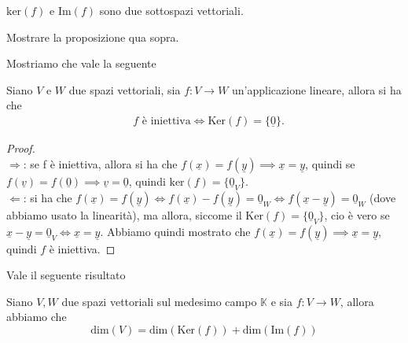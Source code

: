 \begin{prop}
  $\text{ker}(f)$ e $\text{Im}(f)$ sono due sottospazi vettoriali.
\end{prop}
\begin{exercise}
  Mostrare la proposizione qua sopra.
\end{exercise}
Mostriamo che vale la seguente
\begin{prop} \label{prop:kern_iniett}
  Siano $V$ e $W$ due spazi vettoriali, sia $f: V \to W$ un'applicazione lineare, allora si ha che
  \begin{align}
    &f \text{ è iniettiva} \iff \text{Ker}(f) = \{ \underline{0} \}.
  \end{align}
\end{prop}
\begin{proof} \hspace{1cm} \\
  $\boxed{\Rightarrow}$: se f è iniettiva, allora si ha che $f(\underline{x}) = f(\underline{y}) \implies \underline{x} = \underline{y}$, quindi se $f(\underline{v}) = f(\underline{0}) \implies \underline{v} = \underline{0}$, quindi $\text{ker}(f) = \{ \underline{0}_V \}$. \\
  $\boxed{\Leftarrow}$: si ha che $f(\underline{x}) = f(\underline{y}) \iff f(\underline{x}) - f(\underline{y}) = \underline{0}_W \iff f(\underline{x}-\underline{y}) = \underline{0}_W$ (dove abbiamo usato la linearità), ma allora, siccome il $\text{Ker}(f) = \{ \underline{0}_V \}$, cio è vero se
  $\underline{x}-\underline{y} = \underline{0}_V \iff \underline{x} = \underline{y}$. Abbiamo quindi mostrato che $f(\underline{x}) = f(\underline{y}) \implies \underline{x} = \underline{y}$, quindi $f$ è iniettiva.
\end{proof}
Vale il seguente risultato
\begin{theorem} \label{thm:form_dim}
  Siano $V, W$ due spazi vettoriali sul medesimo campo $\mathbb{K}$ e sia $f: V \to W$, allora abbiamo che
  $$
    \text{dim}(V) = \text{dim}(\text{Ker}(f)) + \text{dim}(\text{Im}(f))
  $$
\end{theorem}
